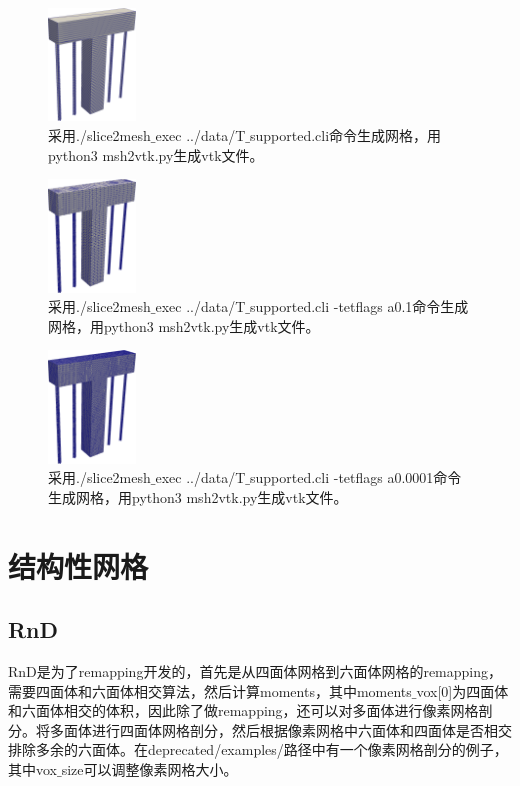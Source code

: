 \begin{figure}[!htbp]
  \centering
  \includegraphics[height=3cm]{fig/1/1.1.7.2:3.png}
  \caption{采用./slice2mesh$\_$exec ../data/T$\_$supported.cli命令生成网格，用python3 msh2vtk.py生成vtk文件。}
  \label{fig:1-7}
\end{figure}

\begin{figure}[!htbp]
  \centering
  \includegraphics[height=3cm]{fig/1/1.1.7.2:4.png}
  \caption{采用./slice2mesh$\_$exec ../data/T$\_$supported.cli -tetflags a0.1命令生成网格，用python3 msh2vtk.py生成vtk文件。}
  \label{fig:1-7}
\end{figure}

\begin{figure}[!htbp]
  \centering
  \includegraphics[height=3cm]{fig/1/1.1.7.2:5.png}
  \caption{采用./slice2mesh$\_$exec ../data/T$\_$supported.cli -tetflags a0.0001命令生成网格，用python3 msh2vtk.py生成vtk文件。}
  \label{fig:1-7}
\end{figure}


\section{结构性网格}

\subsection{RnD}

RnD是为了remapping开发的，首先是从四面体网格到六面体网格的remapping，需要四面体和六面体相交算法，然后计算moments，其中moments$\_$vox[0]为四面体和六面体相交的体积，因此除了做remapping，还可以对多面体进行像素网格剖分。将多面体进行四面体网格剖分，然后根据像素网格中六面体和四面体是否相交排除多余的六面体。在deprecated/examples/路径中有一个像素网格剖分的例子，其中vox$\_$size可以调整像素网格大小。

